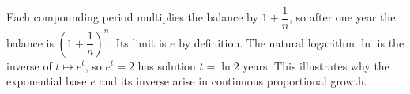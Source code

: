 Each compounding period multiplies the balance by $1+\dfrac{1}{n}$, so after one year the balance is $(1+\dfrac{1}{n})^n$. Its limit is $\boxed e$ by definition. The natural logarithm $\ln$ is the inverse of $t\mapsto e^t$, so $e^t=2$ has solution $\boxed{t=\ln2}$ years. This illustrates why the exponential base $e$ and its inverse arise in continuous proportional growth.
